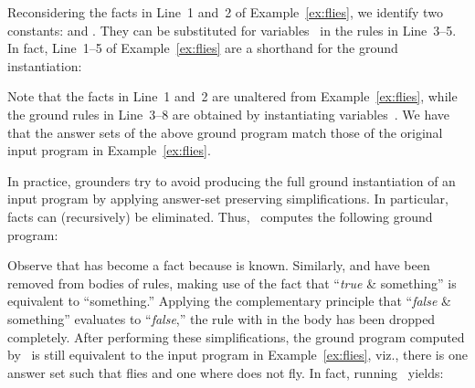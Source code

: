 \begin{example}\label{ex:flies:ground}
Reconsidering the facts in Line~1 and~2 of Example~\ref{ex:flies},
we identify two constants:  and .
They can be substituted for variables~ in the rules in Line~3--5.
In fact, Line~1--5 of Example~\ref{ex:flies} are a shorthand for the ground instantiation:
%


%
Note that the facts in Line~1 and~2 are unaltered from Example~\ref{ex:flies},
while the ground rules in Line~3--8 are obtained by instantiating variables~.
We have that the answer sets of the above ground program match
those of the original input program in Example~\ref{ex:flies}.

In practice, grounders try to avoid producing the full ground instantiation
of an input program by applying answer-set preserving simplifications.
In particular, facts can (recursively) be eliminated.
Thus, \gringo\ computes the following ground program:%
%


%
Observe that  has become a fact because
 is known.
Similarly,  and 
have been removed from bodies of rules, making use of the fact that ``\textit{true} \& something'' is
equivalent to ``something.''
Applying the complementary principle that ``\textit{false} \& something'' evaluates to ``\textit{false},''
the rule with  in the body has been dropped completely.
After performing these simplifications, the ground program computed by \gringo\ is still
equivalent to the input program in Example~\ref{ex:flies}, viz.,
there is one answer set such that  flies and one where  does not fly.
In fact, running \clasp\ yields:%
\end{example}
